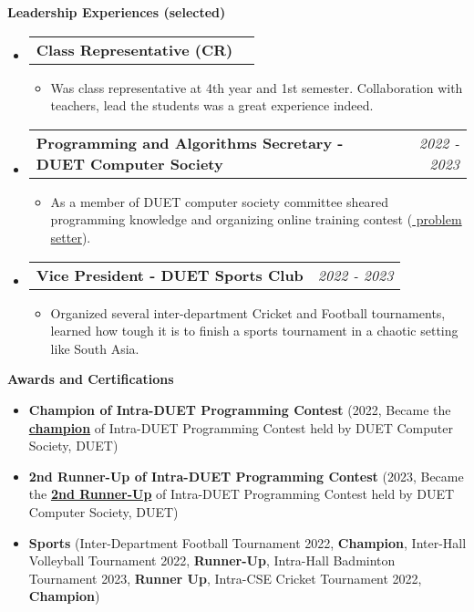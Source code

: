 \documentclass[legalpaper,10pt]{article}
\makeatletter
\newcommand{\resheading}[1]{{\large \colorbox{mygrey}{\begin{minipage}{\textwidth}{\textbf{#1 \vphantom{p\^{E}}}}\end{minipage}}}}
\newcommand{\ressubheading}[4]{
	\begin{tabular*}{7.1in}{l@{\extracolsep{\fill}}r}
		\textbf{#1} & \textit{#4} \\
	\end{tabular*}\vspace{-6pt}}
\makeatother
\begin{document}
	\resheading{Leadership Experiences (selected)}
	\begin{itemize}
            \vspace{0.10in}
            \item \ressubheading{Class Representative (CR)}{}{}{}
		\begin{itemize}
		    \item Was class representative at 4th year and 1st semester. Collaboration with            teachers, lead the students was a great experience indeed.
		\end{itemize}
            
		\item \ressubheading{Programming and Algorithms Secretary - DUET Computer Society}{}{}{ 2022 -  2023}
		\begin{itemize}
		    \item As a member of DUET computer society committee sheared programming knowledge 
                and organizing online training contest (\href{https://toph.co/contests/training/6c3m3hu}{ problem setter}). 
		\end{itemize}
		
		\item \ressubheading{Vice President - DUET Sports Club}{}{}{ 2022 -  2023}
		\begin{itemize}
		    \item Organized several inter-department Cricket and Football tournaments, learned how tough it is to finish a sports tournament in a chaotic setting like South Asia.
		\end{itemize}
		
	\end{itemize}

	\vspace{0.25in}
 
	\resheading{Awards and Certifications}
	\begin{itemize}
            \vspace{0.10in}
	
		\item \textbf{Champion of Intra-DUET Programming Contest} (2022, Became the \href{https://toph.co/contests/training/nmp8c7a/standings}{ \textbf{champion}} of Intra-DUET Programming Contest held by DUET Computer Society, DUET)
		
		\item \textbf{2nd Runner-Up of Intra-DUET Programming Contest} (2023, Became the \href{https://toph.co/contests/training/bvmhmvn/standings}{ \textbf{2nd Runner-Up}} of Intra-DUET Programming Contest held by DUET Computer Society, DUET)

        \item \textbf{Sports} (Inter-Department Football Tournament 2022, \textbf{Champion}, Inter-Hall Volleyball Tournament 2022, \textbf{Runner-Up}, Intra-Hall Badminton Tournament 2023, \textbf{Runner Up}, Intra-CSE Cricket Tournament 2022, \textbf{Champion})

	\end{itemize}
\end{document}
